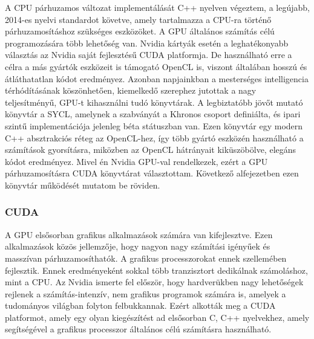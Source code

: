 \documentclass[11pt,a4paper]{article}
\numberwithin{equation}{subsection}
\numberwithin{figure}{section}
\begin{document}
A CPU párhuzamos változat implementálását C++ nyelven végeztem, a legújabb, 2014-es nyelvi standardot követve, amely tartalmazza a CPU-ra történő párhuzamosításhoz szükséges eszközöket. A GPU általános számítás célú programozására több lehetőség van. Nvidia kártyák esetén a leghatékonyabb választás az Nvidia saját fejlesztésű CUDA platformja. De használható erre a célra a más gyártók eszközeit is támogató OpenCL is, viszont általában hosszú és átláthatatlan kódot eredményez. Azonban napjainkban a mesterséges intelligencia térhódításának köszönhetően, kiemelkedő szerephez jutottak a nagy teljesítményű, GPU-t kihasználni tudó könyvtárak. A legbiztatóbb jövőt mutató könyvtár a SYCL, amelynek a szabványát a Khronos csoport definiálta, és ipari szintű implementációja jelenleg béta státuszban van. Ezen könyvtár egy modern C++ absztrakciós réteg az OpenCL-hez, így több gyártó eszközén használható a számítások gyorsításra, miközben az OpenCL hátrányait kiküszöbölve, elegáns kódot eredményez. Mivel én Nvidia GPU-val rendelkezek, ezért a GPU párhuzamosításra CUDA könyvtárat választottam. Következő alfejezetben ezen könyvtár működését mutatom be röviden. 

 
\subsubsection{CUDA}\label{sec:CUDA}
A GPU elsősorban grafikus alkalmazások számára van kifejlesztve. Ezen alkalmazások közös jellemzője, hogy nagyon nagy számítási igényűek és masszívan párhuzamosíthatók. A grafikus processzorokat ennek szellemében fejlesztik. Ennek eredményeként sokkal több tranzisztort dedikálnak számoláshoz, mint a CPU. Az Nvidia ismerte fel először, hogy hardverükben nagy lehetőségek rejlenek a számítás-intenzív, nem grafikus programok számára is, amelyek a tudományos világban folyton felbukkannak. Ezért alkották meg a CUDA platformot, amely egy olyan kiegészítést ad elsősorban C, C++ nyelvekhez, amely segítségével a grafikus processzor általános célú számításra használható. 
\end{document}
